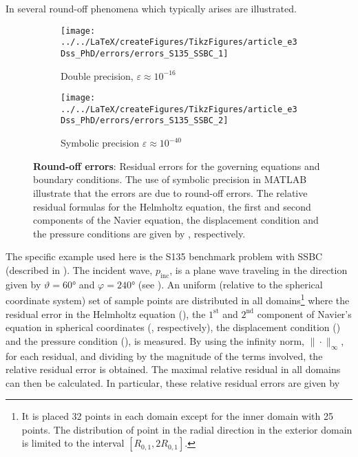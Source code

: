 In  several round-off phenomena which typically arises are illustrated.
\begin{figure}
	\centering
	\begin{subfigure}[t]{0.49\textwidth}
		\texttt{[image: ../../LaTeX/createFigures/TikzFigures/article\_e3Dss\_PhD/errors/errors\_S135\_SSBC\_1]}
		\caption{Double precision, $\varepsilon \approx 10^{-16}$}
	\end{subfigure}%
	\hspace*{0.02\textwidth}%
	\begin{subfigure}[t]{0.49\textwidth}
		\texttt{[image: ../../LaTeX/createFigures/TikzFigures/article\_e3Dss\_PhD/errors/errors\_S135\_SSBC\_2]}
		\caption{Symbolic precision $\varepsilon \approx 10^{-40}$}
	\end{subfigure}
	\caption{\textbf{Round-off errors}: Residual errors for the governing equations and boundary conditions. The use of symbolic precision in MATLAB illustrate that the errors are due to round-off errors. The relative residual formulas for the Helmholtz equation, the first and second components of the Navier equation, the displacement condition and the pressure conditions are given by , respectively.}
	\label{Fig1:errorsS123_ASI-6NN}
\end{figure}
The specific example used here is the S135 benchmark problem with SSBC (described in ). The incident wave, $p_{\mathrm{inc}}$, is a plane wave traveling in the direction given by $\vartheta=\ang{60}$ and $\varphi=\ang{240}$ (see ). An uniform (relative to the spherical coordinate system) set of sample points are distributed in all domains\footnote{It is placed 32 points in each domain except for the inner domain with 25 points. The distribution of point in the radial direction in the exterior domain is limited to the interval $[R_{0,1}, 2R_{0,1}]$.} where the residual error in the Helmholtz equation (), the $1^{\mathrm{st}}$ and $2^{\mathrm{nd}}$ component of Navier's equation in spherical coordinates (, respectively), the displacement condition () and the pressure condition (), is measured. By using the infinity norm, $\|\cdot\|_\infty$, for each residual, and dividing by the magnitude of the terms involved, the relative residual error is obtained. The maximal relative residual in all domains can then be calculated. In particular, these relative residual errors are given by

